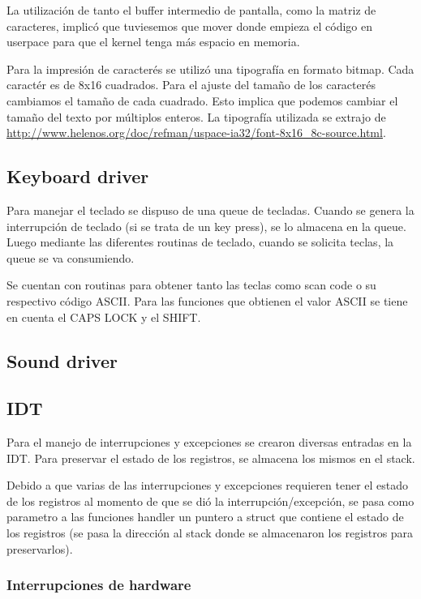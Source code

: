 \documentclass{article}
\begin{document}
La utilización de tanto el buffer intermedio de pantalla, como la matriz de caracteres, implicó que tuviesemos que mover donde empieza el código en userpace para que el kernel tenga más espacio en memoria.

Para la impresión de caracterés se utilizó una tipografía en formato bitmap. Cada caractér es de 8x16 cuadrados. Para el ajuste del tamaño de los caracterés cambiamos el tamaño de cada cuadrado. Esto implica que podemos cambiar el tamaño del texto por múltiplos enteros. La tipografía utilizada se extrajo de \url{http://www.helenos.org/doc/refman/uspace-ia32/font-8x16_8c-source.html}.

\subsection {Keyboard driver}

Para manejar el teclado se dispuso de una queue de tecladas. Cuando se genera la interrupción de teclado (si se trata de un key press), se lo almacena en la queue. Luego mediante las diferentes routinas de teclado, cuando se solicita teclas, la queue se va consumiendo.

Se cuentan con routinas para obtener tanto las teclas como scan code o su respectivo código ASCII. Para las funciones que obtienen el valor ASCII se tiene en cuenta el CAPS LOCK y el SHIFT.

\subsection {Sound driver}

\subsection {IDT}

Para el manejo de interrupciones y excepciones se crearon diversas entradas en la IDT. Para preservar el estado de los registros, se almacena los mismos en el stack.

Debido a que varias de las interrupciones y excepciones requieren tener el estado de los registros al momento de que se dió la interrupción/excepción, se pasa como parametro a las funciones handler un puntero a struct que contiene el estado de los registros (se pasa la dirección al stack donde se almacenaron los registros para preservarlos).

\subsubsection {Interrupciones de hardware}
\end{document}
